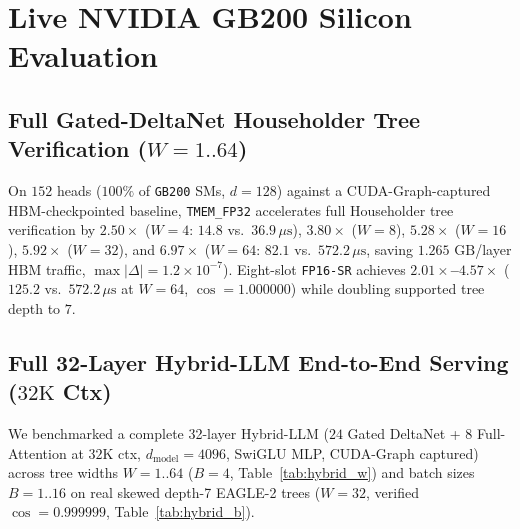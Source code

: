 \documentclass[conference,10pt]{IEEEtran}
\begin{document}
\section{Live NVIDIA GB200 Silicon Evaluation}

\subsection{Full Gated-DeltaNet Householder Tree Verification ($W{=}1..64$)}
On $152$ heads ($100\%$ of \texttt{GB200} SMs, $d{=}128$) against a CUDA-Graph-captured HBM-checkpointed baseline, \texttt{TMEM\_FP32} accelerates full Householder tree verification by \textbf{$2.50\times$} ($W{=}4$: $14.8$ vs.\ $36.9\,\mu\text{s}$), \textbf{$3.80\times$} ($W{=}8$), \textbf{$5.28\times$} ($W{=}16$), \textbf{$5.92\times$} ($W{=}32$), and \textbf{$6.97\times$} ($W{=}64$: $82.1$ vs.\ $572.2\,\mu\text{s}$, saving $1.265\text{ GB}$/layer HBM traffic, $\max|\Delta|{=}1.2{\times}10^{-7}$). Eight-slot \texttt{FP16-SR} achieves \textbf{$2.01\times$--$4.57\times$} ($125.2$ vs.\ $572.2\,\mu\text{s}$ at $W{=}64$, $\cos{=}1.000000$) while doubling supported tree depth to $7$.

\subsection{Full 32-Layer Hybrid-LLM End-to-End Serving ($32\text{K}$ Ctx)}
We benchmarked a complete 32-layer Hybrid-LLM ($24$ Gated DeltaNet + $8$ Full-Attention at $32\text{K}$ ctx, $d_{\text{model}}{=}4096$, SwiGLU MLP, CUDA-Graph captured) across tree widths $W{=}1..64$ ($B{=}4$, Table~\ref{tab:hybrid_w}) and batch sizes $B{=}1..16$ on real skewed depth-7 EAGLE-2 trees ($W{=}32$, verified $\cos{=}0.999999$, Table~\ref{tab:hybrid_b}).
\end{document}
